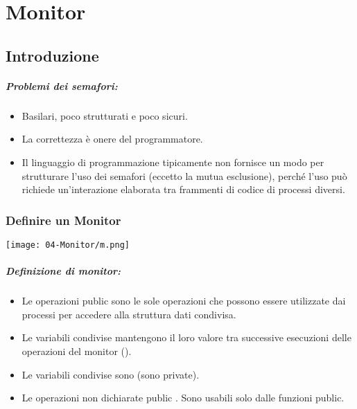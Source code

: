 \chapter{Monitor}

\section{Introduzione}

\paragraph{Problemi dei semafori:}

\begin{itemize}
	\item Basilari, poco strutturati e poco sicuri.
	\item La correttezza è onere del programmatore.
	\item Il linguaggio di programmazione tipicamente non fornisce un modo per
	      strutturare l’uso dei semafori (eccetto la mutua esclusione), perché
	      l’uso può richiede un’interazione elaborata tra frammenti di codice di
	      processi diversi.
\end{itemize}



\subsection{Definire un Monitor}

\begin{center}
	\texttt{[image: 04-Monitor/m.png]}
\end{center}

\paragraph{Definizione di monitor:}

\begin{itemize}
	\item Le operazioni public sono le sole operazioni che possono
	      essere utilizzate dai processi per accedere alla struttura dati
	      condivisa.
	\item Le variabili condivise mantengono il loro valore tra
	      successive esecuzioni delle operazioni del monitor ().
	\item Le variabili condivise sono  (sono private).
	\item Le operazioni non dichiarate public . Sono usabili solo dalle funzioni public.
\end{itemize}

